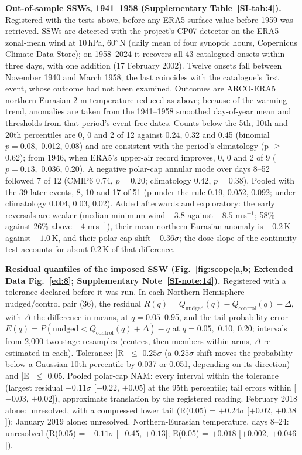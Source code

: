 \documentclass[11pt]{article}
\begin{document}
\textbf{Out-of-sample SSWs, 1941–1958 (Supplementary Table~\ref{SI-tab:4}).} Registered with the tests above, before any ERA5 surface value before 1959 was retrieved. SSWs are detected with the project's CP07 detector on the ERA5 zonal-mean wind at 10\,hPa, 60$^\circ$\,N (daily mean of four synoptic hours, Copernicus Climate Data Store); on 1958–2024 it recovers all 43 catalogued onsets within three days, with one addition (17 February 2002). Twelve onsets fall between November 1940 and March 1958; the last coincides with the catalogue's first event, whose outcome had not been examined. Outcomes are ARCO-ERA5 northern-Eurasian 2 m temperature reduced as above; because of the warming trend, anomalies are taken from the 1941–1958 smoothed day-of-year mean and thresholds from that period's event-free dates. Counts below the 5th, 10th and 20th percentiles are 0, 0 and 2 of 12 against 0.24, 0.32 and 0.45 (binomial $p = 0.08,$ 0.012, 0.08) and are consistent with the period's climatology (p $\ge$ 0.62); from 1946, when ERA5's upper-air record improves, 0, 0 and 2 of 9 ($p = 0.13,$ 0.036, 0.20). A negative polar-cap annular mode over days 8–52 followed 7 of 12 (CMIP6 0.74, $p = 0.20$; climatology 0.42, $p = 0.38$). Pooled with the 39 later events, 8, 10 and 17 of 51 (p under the rule 0.19, 0.052, 0.092; under climatology 0.004, 0.03, 0.02). Added afterwards and exploratory: the early reversals are weaker (median minimum wind $-3.8$ against $-8.5$ m\,s$^{-1}$; 58\% against 26\% above $-4$ m\,s$^{-1}$), their mean northern-Eurasian anomaly is $-0.2$\,K against $-1.0$\,K, and their polar-cap shift $-0.36\sigma$; the dose slope of the continuity test accounts for about 0.2\,K of that difference.

\textbf{Residual quantiles of the imposed SSW (Fig.~\ref{fig:scope}a,b; Extended Data Fig.~\ref{ed:8}; Supplementary Note~\ref{SI-note:14}).} Registered with a tolerance declared before it was run. In each Northern Hemisphere nudged/control pair (36), the residual $R(q) = Q_{\mathrm{nudged}}(q) - Q_{\mathrm{control}}(q) - \Delta$, with $\Delta$ the difference in means, at $q = 0.05$–0.95, and the tail-probability error $E(q) = P(\text{nudged} < Q_{\mathrm{control}}(q) + \Delta) - q$ at $q = 0.05,$ 0.10, 0.20; intervals from 2,000 two-stage resamples (centres, then members within arms, $\Delta$ re-estimated in each). Tolerance: |R| $\le$ $0.25\sigma$ (a $0.25\sigma$ shift moves the probability below a Gaussian 10th percentile by 0.037 or 0.051, depending on its direction) and |E| $\le$ 0.05. Pooled polar-cap NAM: every interval within the tolerance (largest residual $-0.11\sigma$ [$-0.22$, $+0.05$] at the 95th percentile; tail errors within [$-0.03$, $+0.02$]), approximate translation by the registered reading. February 2018 alone: unresolved, with a compressed lower tail (R(0.05) = $+0.24\sigma$ [$+0.02$, $+0.38$]); January 2019 alone: unresolved. Northern-Eurasian temperature, days 8–24: unresolved (R(0.05) = $-0.11\sigma$ [$-0.45$, $+0.13$]; E(0.05) = $+0.018$ [$+0.002$, $+0.046$]).
\end{document}
